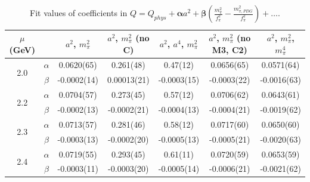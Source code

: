 \documentclass[12pt]{extarticle}
\begin{document}
\begin{table}[h!]
\begin{center}
\begin{tabular}{|c c|c|c|c|c|c|}
\hline
$\mu$ (GeV) &  & $a^2$, $m_\pi^2$& $a^2$, $m_\pi^2$ (no C)& $a^2$, $a^4$, $m_\pi^2$& $a^2$, $m_\pi^2$ (no M3, C2)& $a^2$, $m_\pi^2$, $m_\pi^4$\\
\hline
\multirow{2}{0.5in}{2.0} & $\alpha$ & 0.0620(65)& 0.261(48)& 0.47(12)& 0.0656(65)& 0.0571(64)\\
 & $\beta$ & -0.0002(14)& 0.00013(21)& -0.0003(15)& -0.0003(22)& -0.0016(63)\\
\hline
\multirow{2}{0.5in}{2.2} & $\alpha$ & 0.0704(57)& 0.273(45)& 0.57(12)& 0.0706(62)& 0.0643(61)\\
 & $\beta$ & -0.0002(13)& -0.0002(21)& -0.0004(13)& -0.0004(21)& -0.0019(62)\\
\hline
\multirow{2}{0.5in}{2.3} & $\alpha$ & 0.0713(57)& 0.281(46)& 0.58(12)& 0.0717(60)& 0.0650(60)\\
 & $\beta$ & -0.0003(13)& -0.0002(20)& -0.0005(13)& -0.0005(21)& -0.0020(63)\\
\hline
\multirow{2}{0.5in}{2.4} & $\alpha$ & 0.0719(55)& 0.293(45)& 0.61(11)& 0.0720(59)& 0.0653(59)\\
 & $\beta$ & -0.0003(11)& -0.0003(20)& -0.0005(14)& -0.0006(21)& -0.0021(62)\\
\hline
\end{tabular}
\caption{Fit values of coefficients in $Q = Q_{phys} + \mathbf{\alpha} a^2 + \mathbf{\beta}\left(\frac{m_\pi^2}{f_\pi^2}-\frac{m_{\pi,PDG}^2}{f_\pi^2}\right) + \ldots$.}
\end{center}
\end{table}




















\clearpage
\end{document}
